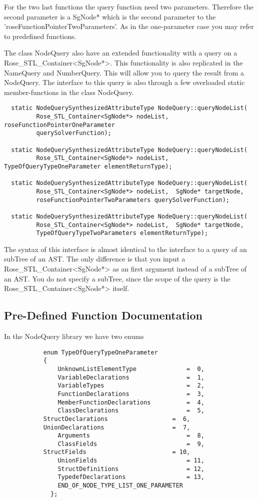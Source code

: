{For the two last functions the query function need two
parameters. Therefore the second parameter is a SgNode* which is the
second parameter to the 'roseFunctionPointerTwoParameters'. As in the
one-parameter case you may refer to predefined functions.

The class NodeQuery also have an extended functionality with a query
on a Rose_STL_Container<SgNode*>. This functionality is also replicated in the
NameQuery and NumberQuery. This will allow you to query the result
from a NodeQuery. The interface to this query is also through a few
overloaded static member-functions in the class NodeQuery.
\begin{verbatim}
  static NodeQuerySynthesizedAttributeType NodeQuery::queryNodeList(
         Rose_STL_Container<SgNode*> nodeList, roseFunctionPointerOneParameter
         querySolverFunction);

  static NodeQuerySynthesizedAttributeType NodeQuery::queryNodeList(
         Rose_STL_Container<SgNode*> nodeList, TypeOfQueryTypeOneParameter elementReturnType);
	  
  static NodeQuerySynthesizedAttributeType NodeQuery::queryNodeList(
         Rose_STL_Container<SgNode*> nodeList,  SgNode* targetNode, 
         roseFunctionPointerTwoParameters querySolverFunction);  

  static NodeQuerySynthesizedAttributeType NodeQuery::queryNodeList(
         Rose_STL_Container<SgNode*> nodeList,  SgNode* targetNode, 
         TypeOfQueryTypeTwoParameters elementReturnType);
\end{verbatim}
The syntax of this interface is almost identical to the interface to a query
of an subTree of an AST.  The only difference is that you input a
Rose_STL_Container<SgNode*> as an first argument instead of a subTree of an AST. You
do not specify a subTree, since the scope of the query is the Rose_STL_Container<SgNode*> itself.  

\subsection{Pre-Defined Function Documentation}
\label{FunctionDocumentation}

In the NodeQuery library we have two enums
\begin{verbatim}
           enum TypeOfQueryTypeOneParameter		
	       {
               UnknownListElementType              =  0,
               VariableDeclarations                =  1,
               VariableTypes                       =  2,
               FunctionDeclarations                =  3,
               MemberFunctionDeclarations          =  4,
               ClassDeclarations                   =  5,
	       StructDeclarations                  =  6,
	       UnionDeclarations                   =  7,
               Arguments                           =  8,
               ClassFields                         =  9,
	       StructFields                        = 10,
               UnionFields                         = 11,
               StructDefinitions                   = 12,
               TypedefDeclarations                 = 13,
               END_OF_NODE_TYPE_LIST_ONE_PARAMETER
             };
	 

\end{verbatim}}
